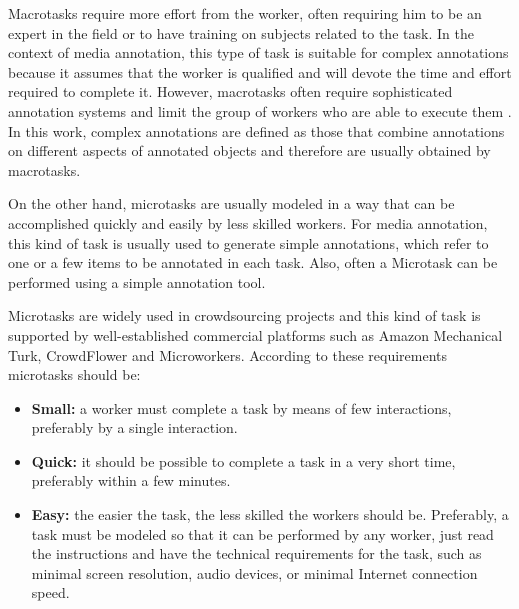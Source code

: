 Macrotasks require more effort from the worker, often requiring him to be an expert in the field or to have training on subjects related to the task. In the context of media annotation, this type of task is suitable for complex annotations because it assumes that the worker is qualified and will devote the time and effort required to complete it. However, macrotasks often require sophisticated annotation systems and limit the group of workers who are able to execute them \citep{Haas:2015:AMC:2824032.2824062}. In this work, complex annotations are defined as those that combine annotations on different aspects of annotated objects and therefore are usually obtained by macrotasks.

On the other hand, microtasks are usually modeled in a way that can be accomplished quickly and easily by less skilled workers. For media annotation, this kind of task is usually used to generate simple annotations, which refer to one or a few items to be annotated in each task. Also, often a Microtask can be performed using a simple annotation tool. 

Microtasks are widely used in crowdsourcing projects and this kind of task is supported by well-established commercial platforms such as Amazon Mechanical Turk, CrowdFlower and Microworkers.  According to these requirements microtasks should be:
\begin{itemize}
	\item{\textbf{Small:}} a worker must complete a task by means of few interactions, preferably by a single interaction.
	
	\item{\textbf{Quick:}} it should be possible to complete a task in a very short time, preferably within a few minutes.

	\item{\textbf{Easy:}} the easier the task, the less skilled the workers should be. Preferably, a task must be modeled so that it can be performed by any worker, just read the instructions and have the technical requirements for the task, such as minimal screen resolution, audio devices, or minimal Internet connection speed.
\end{itemize}



